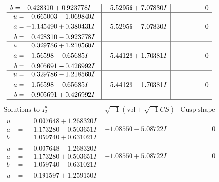 \documentclass[1p]{elsarticle_modified}
\theoremstyle{definition}
\newcommand{\I}{\sqrt{-1}}
\begin{document}
$$\begin{array}{c|c|c}
\begin{aligned}
b &= \phantom{-}0.428310 + 0.923778 I\end{aligned}
 & \phantom{-}5.52956 + 7.07830 I & \phantom{-0.000000 } 0 \\ \hline\begin{aligned}
u &= \phantom{-}0.665003 - 1.069840 I \\
a &= -1.145490 + 0.380431 I \\
b &= \phantom{-}0.428310 - 0.923778 I\end{aligned}
 & \phantom{-}5.52956 - 7.07830 I & \phantom{-0.000000 } 0 \\ \hline\begin{aligned}
u &= \phantom{-}0.329786 + 1.218560 I \\
a &= \phantom{-}1.56598 + 0.65685 I \\
b &= \phantom{-}0.905691 - 0.426992 I\end{aligned}
 & -5.44128 + 1.70381 I & \phantom{-0.000000 } 0 \\ \hline\begin{aligned}
u &= \phantom{-}0.329786 - 1.218560 I \\
a &= \phantom{-}1.56598 - 0.65685 I \\
b &= \phantom{-}0.905691 + 0.426992 I\end{aligned}
 & -5.44128 - 1.70381 I & \phantom{-0.000000 } 0\\
 \hline 
 \end{array}$$\newpage$$\begin{array}{c|c|c}  
\text{Solutions to }I^u_{2}& \I (\text{vol} + \sqrt{-1}CS) & \text{Cusp shape}\\
 \hline 
\begin{aligned}
u &= \phantom{-}0.007648 + 1.268320 I \\
a &= \phantom{-}1.173280 - 0.503651 I \\
b &= \phantom{-}1.059740 + 0.631021 I\end{aligned}
 & -1.08550 - 5.08722 I & \phantom{-0.000000 } 0 \\ \hline\begin{aligned}
u &= \phantom{-}0.007648 - 1.268320 I \\
a &= \phantom{-}1.173280 + 0.503651 I \\
b &= \phantom{-}1.059740 - 0.631021 I\end{aligned}
 & -1.08550 + 5.08722 I & \phantom{-0.000000 } 0 \\ \hline\begin{aligned}
u &= \phantom{-}0.191597 + 1.259150 I \\

\end{aligned}
\end{array}$$
\end{document}
